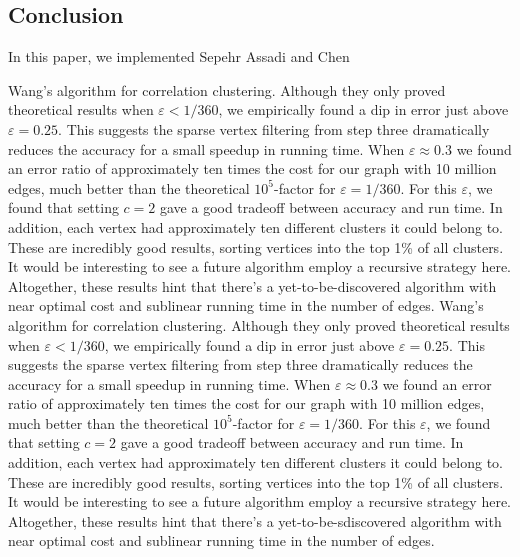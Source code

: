 \documentclass[
]{article}
\begin{document}
\hypertarget{conclusion}{%
  \subsection{Conclusion}\label{conclusion}}

In this paper, we implemented Sepehr Assadi and Chen

Wang's algorithm for correlation clustering. Although they only proved theoretical results when $\varepsilon < 1/360$, we empirically found a dip in error just above $\varepsilon = 0.25$. This suggests the sparse vertex filtering from step three dramatically reduces the accuracy for a small speedup in running time. When $\varepsilon\approx 0.3$ we found an error ratio of approximately ten times the cost for our graph with 10 million edges, much better than the theoretical $10^5$-factor for $\varepsilon = 1/360$. For this $\varepsilon$, we found that setting $c = 2$ gave a good tradeoff between accuracy and run time. In addition, each vertex had approximately ten different clusters it could belong to. These are incredibly good results, sorting vertices into the top 1\% of all clusters. It would be interesting to see a future algorithm employ a recursive strategy here. Altogether, these results hint that there's a yet-to-be-discovered algorithm with near optimal cost and sublinear running time in the number of edges.
Wang's algorithm for correlation clustering. Although they only proved theoretical results when $\varepsilon < 1/360$, we empirically found a dip in error just above $\varepsilon = 0.25$. This suggests the sparse vertex filtering from step three dramatically reduces the accuracy for a small speedup in running time. When $\varepsilon\approx 0.3$ we found an error ratio of approximately ten times the cost for our graph with 10 million edges, much better than the theoretical $10^5$-factor for $\varepsilon = 1/360$. For this $\varepsilon$, we found that setting $c = 2$ gave a good tradeoff between accuracy and run time. In addition, each vertex had approximately ten different clusters it could belong to. These are incredibly good results, sorting vertices into the top 1\% of all clusters. It would be interesting to see a future algorithm employ a recursive strategy here. Altogether, these results hint that there's a yet-to-be-sdiscovered algorithm with near optimal cost and sublinear running time in the number of edges.
\nocite{*}


\end{document}
